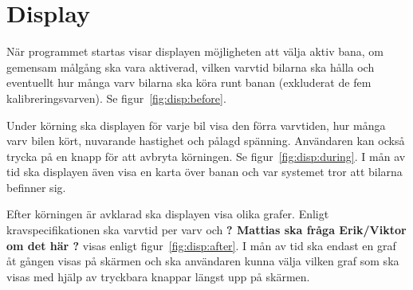 \section{Display}

När programmet startas visar displayen möjligheten att välja aktiv bana, om
gemensam målgång ska vara aktiverad, vilken varvtid bilarna ska hålla och
eventuellt hur många varv bilarna ska köra runt banan (exkluderat de fem
kalibreringsvarven). Se figur~\ref{fig:disp:before}.

Under körning ska displayen för varje bil visa den förra varvtiden, hur många
varv bilen kört, nuvarande hastighet och pålagd spänning. Användaren kan också
trycka på en knapp för att avbryta körningen. Se figur~\ref{fig:disp:during}. I
mån av tid ska displayen även visa en karta över banan och var systemet tror
att bilarna befinner sig.

Efter körningen är avklarad ska displayen visa olika grafer. Enligt
kravspecifikationen ska varvtid per varv och \textbf{? Mattias ska fråga
Erik/Viktor om det här ?} visas enligt figur~\ref{fig:disp:after}. I mån av tid
ska endast en graf åt gången visas på skärmen och ska användaren kunna välja
vilken graf som ska visas med hjälp av tryckbara knappar längst upp på skärmen.

